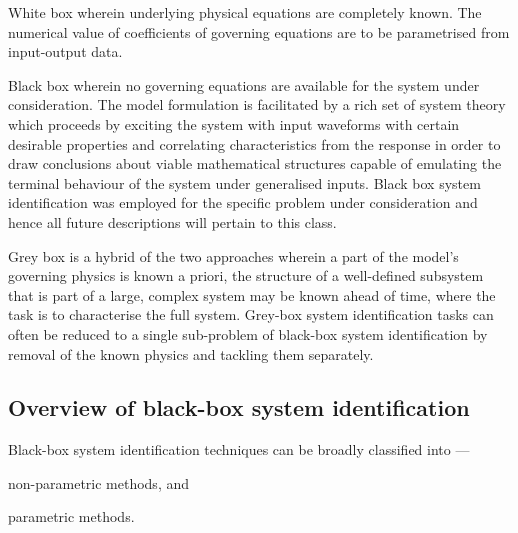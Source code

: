 \begin{enumdescriptnum}[leftmargin=!,itemsep=1ex,labelwidth=\widthof{$\symbf{\text{brugg}_j}\ \scriptstyle (\times 3)$abc}
    ,partopsep=0pt
    ,topsep=0pt
    ]

\item[White box] wherein underlying physical equations are completely known. The
numerical value  of coefficients of  governing equations are to  be parametrised
from input-output data.

\item[Black box]  wherein no  governing equations are  available for  the system
under  consideration. The  model formulation  is facilitated  by a  rich set  of
system theory  which proceeds by exciting  the system with input  waveforms with
certain desirable  properties and correlating characteristics  from the response
in order  to draw  conclusions about viable  mathematical structures  capable of
emulating  the  terminal  behaviour  of the  system  under  generalised  inputs.
Black  box system  identification was  employed for  the specific  problem under
consideration and hence all future descriptions will pertain to this class.

\item[Grey box] is a hybrid of the  two approaches wherein a part of the model's
governing  physics is  known a  priori, \eg{}  the structure  of a  well-defined
subsystem  that is  part  of a  large,  complex  system may  be  known ahead  of
time,  where the  task  is  to characterise  the  full  system. Grey-box  system
identification tasks can  often be reduced to a single  sub-problem of black-box
system  identification  by  removal  of  the known  physics  and  tackling  them
separately.

\end{enumdescriptnum}

\subsection{Overview of black-box system identification}\label{subsec:introblackboxsysid}
Black-box system identification techniques can be broadly classified into ---
\begin{enumerate*}[label=\emph{\alph*})]
     \item non-parametric methods, and
     \item parametric methods.
 \end{enumerate*}

